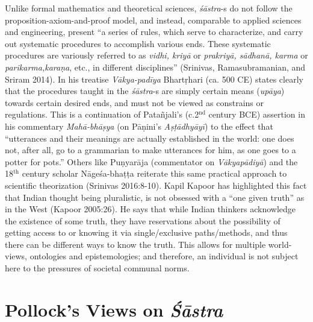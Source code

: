 Unlike formal mathematics and theoretical sciences, {\sl śāstra}-s do not follow the proposition-axiom-and-proof model, and instead, comparable to applied sciences and engineering, present ``a series of rules, which serve to characterize, and carry out systematic procedures to accomplish various ends. These systematic procedures are variously referred to as {\sl vidhi, kriyā} or {\sl prakriyā, sādhanā, karma} or {\sl parikarma,\break karaṇa}, etc., in different disciplines'' (Srinivas, Ramasubramanian, and Sriram 2014). In his treatise {\sl Vākya-padīya} Bhartṛhari (ca. 500 CE) states clearly that the procedures taught in the {\sl śāstra}-s are simply certain means ({\sl upāya}) towards certain desired ends, and must not be viewed as constrains or regulations. This is a continuation of Patañjali's (c.2$^{\text{nd}}$ century BCE) assertion in his commentary {\sl Mahā-bhāṣya} (on Pāṇini’s {\sl Aṣṭādhyāyī}) to the effect that ``utterances and their meanings are actually established in the world: one does not, after all, go to a grammarian to make utterances for him, as one goes to a potter for pots.'' Others like Puṇyarāja (commentator on {\sl Vākyapādiyā}) and the 18$^{\text{th}}$ century scholar Nāgeśa-bhaṭṭa reiterate this same practical approach to scientific theorization (Srinivas 2016:8-10). Kapil Kapoor has highlighted this fact that Indian thought being pluralistic, is not obsessed with a ``one given truth'' as in the West (Kapoor 2005:26). He says that while Indian thinkers acknowledge the existence of some truth, they have reservations about the possibility of getting access to or knowing it via single/exclusive paths/methods, and thus there can be different ways to know the truth. This allows for multiple world-views, ontologies and epistemologies; and therefore, an individual is not subject here to the pressures of societal communal norms.  

\section*{Pollock’s Views on {\sl\bfseries Śāstra}}

